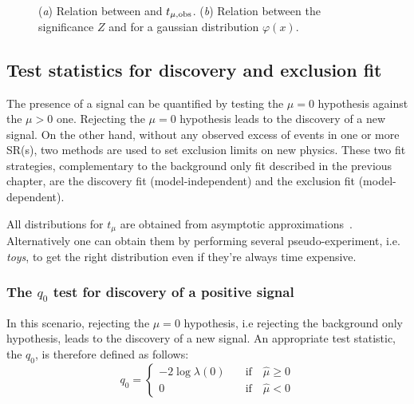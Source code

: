 \begin{figure}[tp]
\centering
{}
\caption{(\emph{a}) Relation between \p and $t_{\mu,\textup{obs}}$. (\emph{b}) Relation between the significance $Z$ and \p for a gaussian distribution $\varphi(x)$.}
\label{pvalue}
\end{figure}

\subsection{Test statistics for discovery and exclusion fit}
The presence of a signal can be quantified by testing the $\mu=0$ hypothesis against the $\mu>0$ one. Rejecting the $\mu=0$ hypothesis leads to the discovery of a new signal. On the other hand, without any observed excess of events in one or more SR(s), two methods are used to set exclusion limits on new physics. These two fit strategies, complementary to the background only fit described in the previous chapter, are the discovery fit (model-independent) and the exclusion fit (model-dependent). %

All distributions for $t_\mu$ are obtained from asymptotic approximations~\cite{Cowan}. Alternatively one can obtain them by performing several pseudo-experiment, i.e. \emph{toys}, to get the right distribution even if they're always time expensive.

\subsubsection{The $q_0$ test for discovery of a positive signal}
In this scenario, rejecting the $\mu = 0$ hypothesis, i.e rejecting the background only hypothesis, leads to the discovery of a new signal.  An appropriate test statistic, the $q_0$, is therefore defined as follows:
\begin{equation}
q_0=
\left\{
\begin{aligned}
-2\log{\lambda(0)}\quad &\text{if}\quad \hat{\mu}\ge0\\
 0 \qquad&\text{if}\quad \hat{\mu}<0
\end{aligned}
\right.
\end{equation} 

